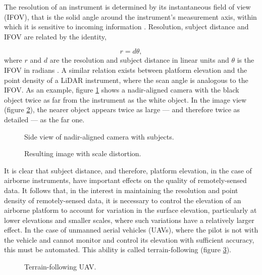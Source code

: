 \documentclass[10pt]{article}
\begin{document}
The resolution of an instrument is determined by its instantaneous field of view (IFOV), that is the solid angle around the instrument's measurement axis, within which it is sensitive to incoming information \cite{Lillesand1999}. Resolution, subject distance and IFOV are related by the identity, 

\begin{equation}
r = d \theta
\label{eq:ifov},
\end{equation} 
where $r$ and $d$ are the resolution and subject distance in linear units and $\theta$ is the IFOV in radians \cite{Lillesand1999}. A similar relation exists between platform elevation and the point density of a LiDAR instrument, where the scan angle is analogous to the IFOV. As an example, figure \ref{fig:scale_cam} shows a nadir-aligned camera with the black object twice as far from the instrument as the white object. In the image view (figure \ref{fig:scale_img}), the nearer object appears twice as large --- and therefore twice as detailed --- as the far one. 

\begin{figure}
\centering
\def\svgscale{0.5}

\caption{Side view of nadir-aligned camera with subjects.}
\label{fig:scale_cam}
\end{figure}

\begin{figure}
\centering
\def\svgscale{0.5}

\caption{Resulting image with scale distortion.}
\label{fig:scale_img}
\end{figure}

It is clear that subject distance, and therefore, platform elevation, in the case of airborne instruments, have important effects on the quality of remotely-sensed data. It follows that, in the interest in maintaining the resolution and point density of remotely-sensed data, it is necessary to control the elevation of an airborne platform to account for variation in the surface elevation, particularly at lower elevations and smaller scales, where such variations have a relatively larger effect. In the case of unmanned aerial vehicles (UAVs), where the pilot is not with the vehicle and cannot monitor and control its elevation with sufficient accuracy, this must be automated. This ability is called terrain-following (figure \ref{fig:uav_terrain}).

\begin{figure}
\centering
\def\svgscale{0.5}

\caption{Terrain-following UAV.}
\label{fig:uav_terrain}
\end{figure}
\end{document}
